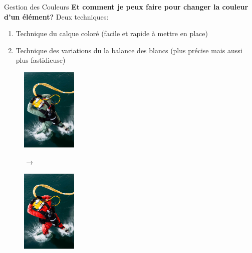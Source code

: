 \documentclass[10pt,svgnames,usenames,table]{beamer}
\begin{document}
	\begin{frame}{Gestion des Couleurs}
	\textbf{Et comment je peux faire pour changer la couleur d'un élément?}
	Deux techniques:
	\begin{enumerate}
		\item Technique du calque coloré (facile et rapide à mettre en place)
		\item Technique des variations du la balance des blancs (plus précise mais aussi plus fastidieuse)
	\end{enumerate}
		\begin{figure}[H]
			\centering
			\begin{minipage}{.5\textwidth}
				\centering
				\includegraphics[height=150px]{Images/colours/col5} 
				\end{minipage}$\rightarrow$%
			\begin{minipage}{.5\textwidth}
				\centering
				\includegraphics[height=150px]{Images/colours/col6} 
				\end{minipage}
			\end{figure}		
	\end{frame}	
\end{document}
